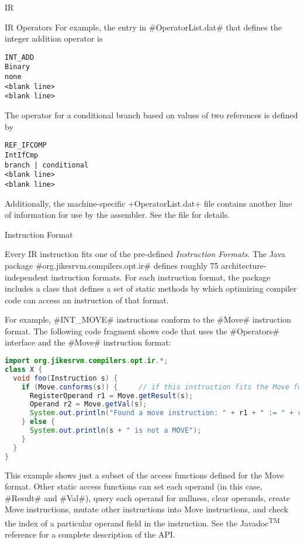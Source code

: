 \begin{subsection}{IR}
\begin{subsubsection}{IR Operators}
For example, the entry in \spverb#OperatorList.dat# that defines the integer addition operator is
\begin{lstlisting}
INT_ADD
Binary
none
<blank line>
<blank line>
\end{lstlisting}

The operator for a conditional branch based on values of two references is defined by
\begin{lstlisting}
REF_IFCOMP
IntIfCmp
branch | conditional
<blank line>
<blank line>
\end{lstlisting}
Additionally, the machine-specific \spverb+OperatorList.dat+ file contains another line of information for use by the assembler. See the file for details.

\end{subsubsection}


\begin{subsubsection}{Instruction Format}

Every IR instruction fits one of the pre-defined \textit{Instruction Formats}. The Java package \spverb#org.jikesrvm.compilers.opt.ir# defines roughly 75 architecture\hyp independent instruction formats. For each instruction format, the package includes a class that defines a set of static methods by which optimizing compiler code can access an instruction of that format.

For example, \spverb#INT_MOVE# instructions conform to the \spverb#Move# instruction format. The following code fragment shows code that uses the \spverb#Operators# interface and the \spverb#Move# instruction format:

\begin{lstlisting}[language=Java]
import org.jikesrvm.compilers.opt.ir.*;
class X {
  void foo(Instruction s) {
    if (Move.conforms(s)) {     // if this instruction fits the Move format
      RegisterOperand r1 = Move.getResult(s);
      Operand r2 = Move.getVal(s);
      System.out.println("Found a move instruction: " + r1 + " := " + r2);
    } else {
      System.out.println(s + " is not a MOVE");
    }
  }
}
\end{lstlisting}

This example shows just a subset of the access functions defined for the Move format. Other static access functions can set each operand (in this case, \spverb#Result# and \spverb#Val#), query each operand for nullness, clear operands, create Move instructions, mutate other instructions into Move instructions, and check the index of a particular operand field in the instruction. See the Javadoc\textsuperscript{TM} reference for a complete description of the API.


\end{subsubsection}
\end{subsection}
